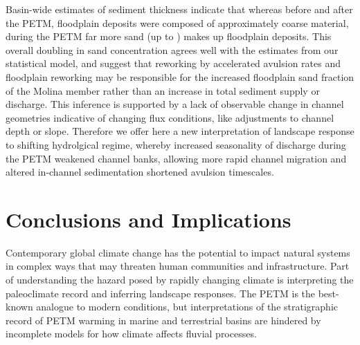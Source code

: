 \documentclass[draft]{compact_proposal}\usepackage[]{graphicx}\usepackage[]{color}
\begin{document}
Basin-wide estimates of sediment thickness indicate that whereas before and after the PETM, floodplain deposits were composed of approximately  coarse material, during the PETM far more sand (up to ) makes up floodplain deposits.
This overall doubling in sand concentration agrees well with the estimates from our statistical model, and suggest that reworking by accelerated avulsion rates and floodplain reworking may be responsible for the increased floodplain sand fraction of the Molina member rather than an increase in total sediment supply or discharge.
This inference is supported by a lack of observable change in channel geometries indicative of changing flux conditions, like adjustments to channel depth or slope.
Therefore we offer here a new interpretation of landscape response to shifting hydrolgical regime, whereby increased seasonality of discharge during the PETM weakened channel banks, allowing more rapid channel migration and altered in-channel sedimentation shortened avulsion timescales.

% 
% 
% 
% 






\section{Conclusions and Implications}


Contemporary global climate change has the potential to impact natural systems in complex ways that may threaten human communities and infrastructure. 
Part of understanding the hazard posed by rapidly changing climate is interpreting the paleoclimate record and inferring landscape responses. 
The PETM is the best-known analogue to modern conditions, but interpretations of the stratigraphic record of PETM warming in marine and terrestrial basins are hindered by incomplete models for how climate affects fluvial processes.
\end{document}
